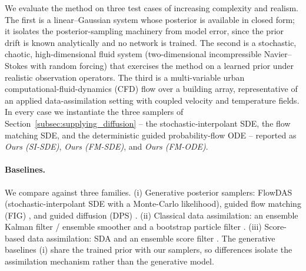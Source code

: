 
\newcommand{\figbox}[3]{%
  \setlength{\fboxsep}{2pt}%
  \fcolorbox{gray!55}{gray!12}{%
    \parbox[c][#2][c]{#1}{\centering\ttfamily\scriptsize
      [figure placeholder]\\[2pt]#3}}%
}

We evaluate the method on three test cases of increasing complexity and realism. The first is a linear--Gaussian system whose posterior is available in closed form; it isolates the posterior-sampling machinery from model error, since the prior drift is known analytically and no network is trained. The second is a stochastic, chaotic, high-dimensional fluid system (two-dimensional incompressible Navier--Stokes with random forcing) that exercises the method on a learned prior under realistic observation operators. The third is a multi-variable urban computational-fluid-dynamics (CFD) flow over a building array, representative of an applied data-assimilation setting with coupled velocity and temperature fields. In every case we instantiate the three samplers of Section~\ref{subsec:supplying_diffusion} -- the stochastic-interpolant SDE, the flow matching SDE, and the deterministic guided probability-flow ODE -- reported as \emph{Ours (SI-SDE)}, \emph{Ours (FM-SDE)}, and \emph{Ours (FM-ODE)}.

\paragraph{Baselines.}
We compare against three families. (i) Generative posterior samplers: FlowDAS \cite{chen_flowdas_2025} (stochastic-interpolant SDE with a Monte-Carlo likelihood), guided flow matching (FIG) \cite{yan_fig_2024}, and guided diffusion (DPS) \cite{chung_diffusion_2023}. (ii) Classical data assimilation: an ensemble Kalman filter / ensemble smoother \cite{evensen_data_2022} and a bootstrap particle filter \cite{carrassi_data_2018}. (iii) Score-based data assimilation: SDA \cite{rozet_score-based_2023} and an ensemble score filter \cite{bao_ensemble_2024}. The generative baselines (i) share the trained prior with our samplers, so differences isolate the assimilation mechanism rather than the generative model.

